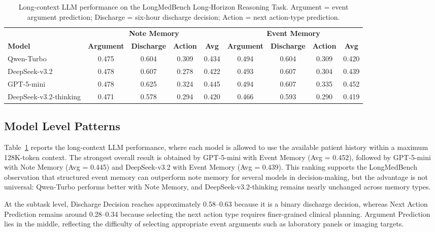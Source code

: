 \begin{table}[!h]
    \centering
    \caption{Long-context LLM performance on the LongMedBench Long-Horizon Reasoning Task. Argument = event argument prediction; Discharge = six-hour discharge decision; Action = next action-type prediction.}
    \label{tab:decision_overall}
    {\fontsize{9}{10.5}\selectfont
    \setlength{\tabcolsep}{2pt}
    \renewcommand{\arraystretch}{1.05}
    \begin{tabular*}{\textwidth}{l@{\extracolsep{\fill}}cccccccc}
        \toprule
        & \multicolumn{4}{c}{\textbf{Note Memory}} & \multicolumn{4}{c}{\textbf{Event Memory}} \\
        \cmidrule(lr){2-5}\cmidrule(lr){6-9}
        \textbf{Model} & \textbf{Argument} & \textbf{Discharge} & \textbf{Action} & \textbf{Avg} & \textbf{Argument} & \textbf{Discharge} & \textbf{Action} & \textbf{Avg} \\
        \midrule
        Qwen-Turbo & 0.475 & 0.604 & 0.309 & 0.434 & 0.494 & 0.604 & 0.309 & 0.420 \\
        DeepSeek-v3.2 & 0.478 & 0.607 & 0.278 & 0.422 & 0.493 & 0.607 & 0.304 & 0.439 \\
        GPT-5-mini & 0.478 & 0.625 & 0.324 & 0.445 & 0.494 & 0.607 & 0.335 & 0.452 \\
        DeepSeek-v3.2-thinking & 0.471 & 0.578 & 0.294 & 0.420 & 0.466 & 0.593 & 0.290 & 0.419 \\
        \bottomrule
    \end{tabular*}}
\end{table}

\subsection{Model Level Patterns}

Table~\ref{tab:decision_overall} reports the long-context LLM performance, where each model is allowed to use the available patient history within a maximum 128K-token context. The strongest overall result is obtained by GPT-5-mini with Event Memory (Avg = 0.452), followed by GPT-5-mini with Note Memory (Avg = 0.445) and DeepSeek-v3.2 with Event Memory (Avg = 0.439). This ranking supports the LongMedBench observation that structured event memory can outperform note memory for several models in decision-making, but the advantage is not universal: Qwen-Turbo performs better with Note Memory, and DeepSeek-v3.2-thinking remains nearly unchanged across memory types.

At the subtask level, Discharge Decision reaches approximately 0.58--0.63 because it is a binary discharge decision, whereas Next Action Prediction remains around 0.28--0.34 because selecting the next action type requires finer-grained clinical planning. Argument Prediction lies in the middle, reflecting the difficulty of selecting appropriate event arguments such as laboratory panels or imaging targets. 

